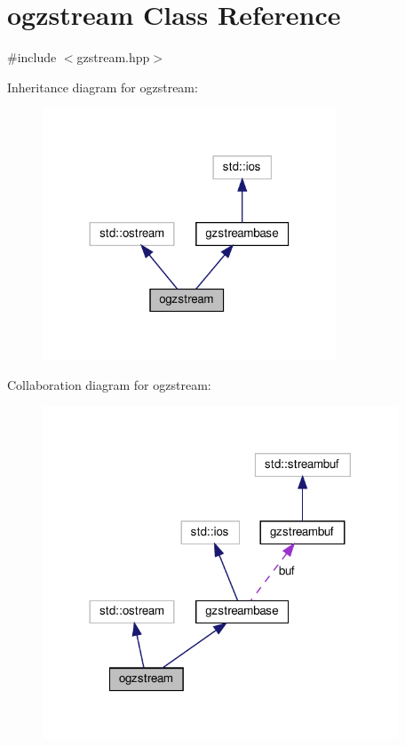 \hypertarget{classogzstream}{}\section{ogzstream Class Reference}
\label{classogzstream}


{\ttfamily \#include $<$gzstream.\+hpp$>$}



Inheritance diagram for ogzstream\+:
\nopagebreak
\begin{figure}[H]
\begin{center}
\leavevmode
\includegraphics[width=248pt]{d4/da8/classogzstream__inherit__graph}
\end{center}
\end{figure}


Collaboration diagram for ogzstream\+:
\nopagebreak
\begin{figure}[H]
\begin{center}
\leavevmode
\includegraphics[width=300pt]{dd/dc3/classogzstream__coll__graph}
\end{center}
\end{figure}
